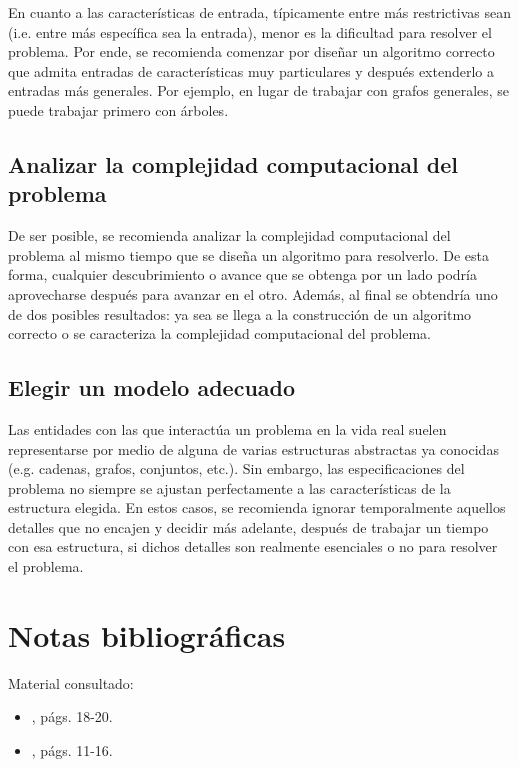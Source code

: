 En cuanto a las características de entrada, típicamente entre más
restrictivas sean (i.e. entre más específica sea la entrada), menor es la dificultad para 
resolver el problema.
Por ende, se recomienda comenzar por diseñar un algoritmo correcto
que admita entradas de características muy particulares y después
extenderlo a entradas más generales. Por ejemplo, en lugar de trabajar
con grafos generales, se puede trabajar primero con árboles.

\subsection{Analizar la complejidad computacional del problema}

De ser posible, se recomienda analizar la complejidad computacional del problema al
mismo tiempo que se diseña un algoritmo para resolverlo. De esta forma,
cualquier descubrimiento o avance que se obtenga por un lado podría
aprovecharse después para avanzar en el otro. Además, al final se
obtendría uno de dos posibles resultados: ya sea se llega a la construcción
de un algoritmo correcto o se caracteriza la complejidad computacional
del problema.

\subsection{Elegir un modelo adecuado}

Las entidades con las que interactúa un problema en la vida real suelen
representarse por medio de alguna de varias estructuras abstractas
ya conocidas (e.g. cadenas, grafos, conjuntos, etc.). Sin embargo,
las especificaciones del problema no siempre se ajustan perfectamente
a las características de la estructura elegida. En estos casos, se
recomienda ignorar temporalmente aquellos detalles que no encajen
y decidir más adelante, después de trabajar un tiempo con esa estructura,
si dichos detalles son realmente esenciales o no para resolver el
problema. 

\section*{Notas bibliográficas}

Material consultado:
\begin{itemize}
    \item \textcite{cormen_introduction_2009}, págs. 18-20. 
    \item \textcite{skiena_algorithm_2011}, págs. 11-16.
\end{itemize}
